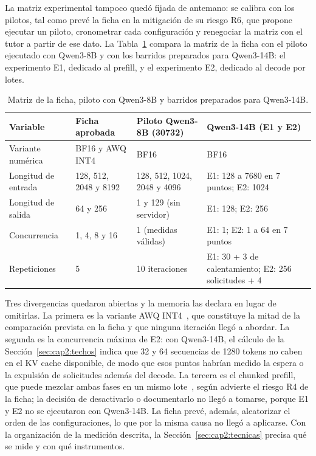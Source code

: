 La matriz experimental tampoco quedó fijada de antemano: se calibra con los pilotos, tal como prevé la ficha en la mitigación de su riesgo R6, que propone ejecutar un piloto, cronometrar cada configuración y renegociar la matriz con el tutor a partir de ese dato. La Tabla~\ref{tab:cap2:divergencias} compara la matriz de la ficha con el piloto ejecutado con Qwen3-8B y con los barridos preparados para Qwen3-14B: el experimento E1, dedicado al prefill, y el experimento E2, dedicado al decode por lotes.

\begin{table}[htbp]
  \centering
  \caption{Matriz de la ficha, piloto con Qwen3-8B y barridos preparados para Qwen3-14B.}
  \label{tab:cap2:divergencias}
  \footnotesize
  \begin{tabular}{|p{}|p{}|p{}|p{}|}
    \hline
    \textbf{Variable} & \textbf{Ficha aprobada} & \textbf{Piloto Qwen3-8B (30732)} & \textbf{Qwen3-14B (E1 y E2)} \\
    \hline
    Variante numérica & BF16 y AWQ INT4 & BF16 & BF16 \\
    \hline
    Longitud de entrada & 128, 512, 2048 y 8192 & 128, 512, 1024, 2048 y 4096 & E1: 128 a 7680 en 7 puntos; E2: 1024 \\
    \hline
    Longitud de salida & 64 y 256 & 1 y 129 (sin servidor) & E1: 128; E2: 256 \\
    \hline
    Concurrencia & 1, 4, 8 y 16 & 1 (medidas válidas) & E1: 1; E2: 1 a 64 en 7 puntos \\
    \hline
    Repeticiones & 5 & 10 iteraciones & E1: 30 + 3 de calentamiento; E2: 256 solicitudes + 4 \\
    \hline
  \end{tabular}
\end{table}

Tres divergencias quedaron abiertas y la memoria las declara en lugar de omitirlas. La primera es la variante AWQ INT4~\cite{lin2024awq}, que constituye la mitad de la comparación prevista en la ficha y que ninguna iteración llegó a abordar. La segunda es la concurrencia máxima de E2: con Qwen3-14B, el cálculo de la Sección~\ref{sec:cap2:techos} indica que 32 y 64 secuencias de 1280 tokens no caben en el KV cache disponible, de modo que esos puntos habrían medido la espera o la expulsión de solicitudes además del decode. La tercera es el chunked prefill, que puede mezclar ambas fases en un mismo lote~\cite{agrawal2024sarathi}, según advierte el riesgo R4 de la ficha; la decisión de desactivarlo o documentarlo no llegó a tomarse, porque E1 y E2 no se ejecutaron con Qwen3-14B. La ficha prevé, además, aleatorizar el orden de las configuraciones, lo que por la misma causa no llegó a aplicarse. Con la organización de la medición descrita, la Sección~\ref{sec:cap2:tecnicas} precisa qué se mide y con qué instrumentos.


